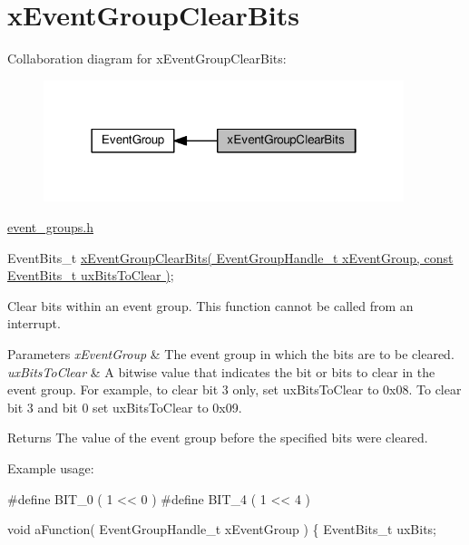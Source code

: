 \hypertarget{group__x_event_group_clear_bits}{}\section{x\+Event\+Group\+Clear\+Bits}
\label{group__x_event_group_clear_bits}
Collaboration diagram for x\+Event\+Group\+Clear\+Bits\+:\nopagebreak
\begin{figure}[H]
\begin{center}
\leavevmode
\includegraphics[width=298pt]{group__x_event_group_clear_bits}
\end{center}
\end{figure}
\hyperlink{event__groups_8h}{event\+\_\+groups.\+h} 
\begin{DoxyPre}
   EventBits\_t \hyperlink{event__groups_8h_a0fb72cfdd4f0d5f86d955fc3af448f2a}{xEventGroupClearBits( EventGroupHandle\_t xEventGroup, const EventBits\_t uxBitsToClear )};
\end{DoxyPre}


Clear bits within an event group. This function cannot be called from an interrupt.


\begin{DoxyParams}{Parameters}
{\em x\+Event\+Group} & The event group in which the bits are to be cleared.\\
\hline
{\em ux\+Bits\+To\+Clear} & A bitwise value that indicates the bit or bits to clear in the event group. For example, to clear bit 3 only, set ux\+Bits\+To\+Clear to 0x08. To clear bit 3 and bit 0 set ux\+Bits\+To\+Clear to 0x09.\\
\hline
\end{DoxyParams}
\begin{DoxyReturn}{Returns}
The value of the event group before the specified bits were cleared.
\end{DoxyReturn}
Example usage\+: 
\begin{DoxyPre}
  #define BIT\_0 ( 1 << 0 )
  #define BIT\_4 ( 1 << 4 )\end{DoxyPre}



\begin{DoxyPre}  void aFunction( EventGroupHandle\_t xEventGroup )
  \{
  EventBits\_t uxBits;\end{DoxyPre}



